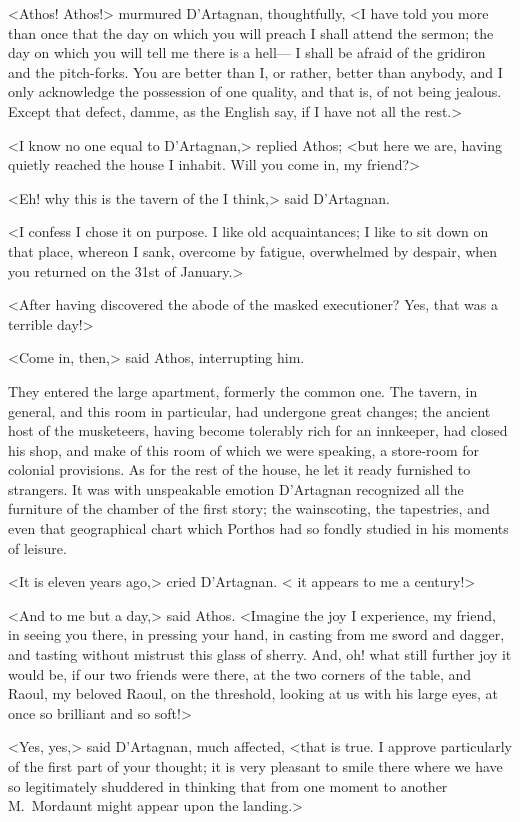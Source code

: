 <Athos! Athos!> murmured D'Artagnan, thoughtfully, <I have told you more than once that the day on which you will preach I shall attend the sermon; the day on which you will tell me there is a hell— I shall be afraid of the gridiron and the pitch-forks. You are better than I, or rather, better than anybody, and I only acknowledge the possession of one quality, and that is, of not being jealous. Except that defect, damme, as the English say, if I have not all the rest.>

<I know no one equal to D'Artagnan,> replied Athos; <but here we are, having quietly reached the house I inhabit. Will you come in, my friend?>

<Eh! why this is the tavern of the  I think,> said D'Artagnan.

<I confess I chose it on purpose. I like old acquaintances; I like to sit down on that place, whereon I sank, overcome by fatigue, overwhelmed by despair, when you returned on the 31st of January.>

<After having discovered the abode of the masked executioner? Yes, that was a terrible day!>

<Come in, then,> said Athos, interrupting him.

They entered the large apartment, formerly the common one. The tavern, in general, and this room in particular, had undergone great changes; the ancient host of the musketeers, having become tolerably rich for an innkeeper, had closed his shop, and make of this room of which we were speaking, a store-room for colonial provisions. As for the rest of the house, he let it ready furnished to strangers. It was with unspeakable emotion D'Artagnan recognized all the furniture of the chamber of the first story; the wainscoting, the tapestries, and even that geographical chart which Porthos had so fondly studied in his moments of leisure.

<It is eleven years ago,> cried D'Artagnan. < it appears to me a century!>

<And to me but a day,> said Athos. <Imagine the joy I experience, my friend, in seeing you there, in pressing your hand, in casting from me sword and dagger, and tasting without mistrust this glass of sherry. And, oh! what still further joy it would be, if our two friends were there, at the two corners of the table, and Raoul, my beloved Raoul, on the threshold, looking at us with his large eyes, at once so brilliant and so soft!>

<Yes, yes,> said D'Artagnan, much affected, <that is true. I approve particularly of the first part of your thought; it is very pleasant to smile there where we have so legitimately shuddered in thinking that from one moment to another M.~Mordaunt might appear upon the landing.>

